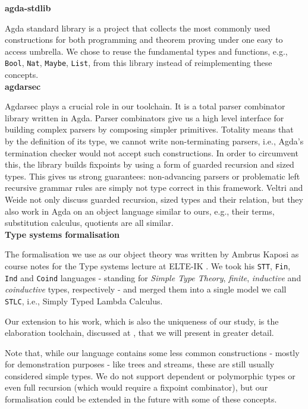 \noindent\textbf{agda-stdlib}

Agda standard library \cite{The_Agda_Community_Agda_Standard_Library_2023} is a project that collects the most commonly used constructions for both programming and theorem proving under one easy to access umbrella. We chose to reuse the fundamental types and functions, e.g., \verb$Bool$, \verb$Nat$, \verb$Maybe$, \verb$List$, from this library instead of reimplementing these concepts.\\

\noindent\textbf{agdarsec}

Agdarsec \cite{allais2018agdarsec} plays a crucial role in our toolchain. It is a total parser combinator library written in Agda. Parser combinators give us a high level interface for building complex parsers by composing simpler primitives. Totality means that by the definition of its type, we cannot write non-terminating parsers, i.e., Agda's termination checker would not accept such constructions. In order to circumvent this, the library builds fixpoints by using a form of guarded recursion and sized types. This gives us strong guarantees: non-advancing parsers or problematic left recursive grammar rules are simply not type correct in this framework. Veltri and Weide \cite{veltri2019guarded} not only discuss guarded recursion, sized types and their relation, but they also work in Agda on an object language similar to ours, e.g., their terms, substitution calculus, quotients are all similar.\\

\noindent\textbf{Type systems formalisation}

The formalisation we use as our object theory was written by Ambrus Kaposi as course notes for the Type systems lecture at ELTE-IK \cite{typesystems-repo}. We took his \verb$STT$, \verb$Fin$, \verb$Ind$ and \verb$Coind$ languages - standing for \textit{Simple Type Theory}, \textit{finite}, \textit{inductive} and \textit{coinductive} types, respectively - and merged them into a single model we call \verb$STLC$, i.e., Simply Typed Lambda Calculus.

Our extension to his work, which is also the uniqueness of our study, is the elaboration toolchain, discussed at \cite{godelTalk}, that we will present in greater detail.

Note that, while our language contains some less common constructions - mostly for demonstration purposes - like trees and streams, these are still usually considered simple types. We do not support dependent or polymorphic types or even full recursion (which would require a fixpoint combinator), but our formalisation could be extended in the future with some of these concepts.


